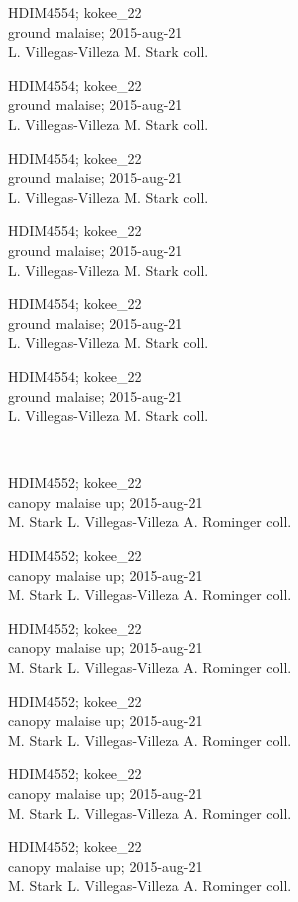 \documentclass[2pt]{extarticle}
\begin{document}
\noindent
\parbox{0.16\textwidth}{\tiny \raggedright \rule[-0.3\baselineskip]{0pt}{10pt}HDIM4554; kokee\_22\\ ground malaise; 2015-aug-21\\ L. Villegas-Villeza M. Stark coll.}
\parbox{0.16\textwidth}{\tiny \raggedright \rule[-0.3\baselineskip]{0pt}{10pt}HDIM4554; kokee\_22\\ ground malaise; 2015-aug-21\\ L. Villegas-Villeza M. Stark coll.}
\parbox{0.16\textwidth}{\tiny \raggedright \rule[-0.3\baselineskip]{0pt}{10pt}HDIM4554; kokee\_22\\ ground malaise; 2015-aug-21\\ L. Villegas-Villeza M. Stark coll.}
\parbox{0.16\textwidth}{\tiny \raggedright \rule[-0.3\baselineskip]{0pt}{10pt}HDIM4554; kokee\_22\\ ground malaise; 2015-aug-21\\ L. Villegas-Villeza M. Stark coll.}
\parbox{0.16\textwidth}{\tiny \raggedright \rule[-0.3\baselineskip]{0pt}{10pt}HDIM4554; kokee\_22\\ ground malaise; 2015-aug-21\\ L. Villegas-Villeza M. Stark coll.}
\parbox{0.16\textwidth}{\tiny \raggedright \rule[-0.3\baselineskip]{0pt}{10pt}HDIM4554; kokee\_22\\ ground malaise; 2015-aug-21\\ L. Villegas-Villeza M. Stark coll.} \\ 
\vspace{0.001in} 

\noindent
\parbox{0.16\textwidth}{\tiny \raggedright \rule[-0.3\baselineskip]{0pt}{10pt}HDIM4552; kokee\_22\\ canopy malaise up; 2015-aug-21\\ M. Stark L. Villegas-Villeza A. Rominger coll.}
\parbox{0.16\textwidth}{\tiny \raggedright \rule[-0.3\baselineskip]{0pt}{10pt}HDIM4552; kokee\_22\\ canopy malaise up; 2015-aug-21\\ M. Stark L. Villegas-Villeza A. Rominger coll.}
\parbox{0.16\textwidth}{\tiny \raggedright \rule[-0.3\baselineskip]{0pt}{10pt}HDIM4552; kokee\_22\\ canopy malaise up; 2015-aug-21\\ M. Stark L. Villegas-Villeza A. Rominger coll.}
\parbox{0.16\textwidth}{\tiny \raggedright \rule[-0.3\baselineskip]{0pt}{10pt}HDIM4552; kokee\_22\\ canopy malaise up; 2015-aug-21\\ M. Stark L. Villegas-Villeza A. Rominger coll.}
\parbox{0.16\textwidth}{\tiny \raggedright \rule[-0.3\baselineskip]{0pt}{10pt}HDIM4552; kokee\_22\\ canopy malaise up; 2015-aug-21\\ M. Stark L. Villegas-Villeza A. Rominger coll.}
\parbox{0.16\textwidth}{\tiny \raggedright \rule[-0.3\baselineskip]{0pt}{10pt}HDIM4552; kokee\_22\\ canopy malaise up; 2015-aug-21\\ M. Stark L. Villegas-Villeza A. Rominger coll.} \\ 
\vspace{0.001in} 
\end{document}

